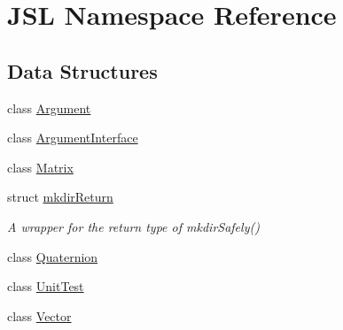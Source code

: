 \hypertarget{namespaceJSL}{}\section{J\+SL Namespace Reference}
\label{namespaceJSL}
\subsection*{Data Structures}
\begin{DoxyCompactItemize}
\item 
class \hyperlink{classJSL_1_1Argument}{Argument}
\item 
class \hyperlink{classJSL_1_1ArgumentInterface}{Argument\+Interface}
\item 
class \hyperlink{classJSL_1_1Matrix}{Matrix}
\item 
struct \hyperlink{structJSL_1_1mkdirReturn}{mkdir\+Return}
\begin{DoxyCompactList}\small\item\em A wrapper for the return type of mkdir\+Safely() \end{DoxyCompactList}\item 
class \hyperlink{classJSL_1_1Quaternion}{Quaternion}
\item 
class \hyperlink{classJSL_1_1UnitTest}{Unit\+Test}
\item 
class \hyperlink{classJSL_1_1Vector}{Vector}
\end{DoxyCompactItemize}
